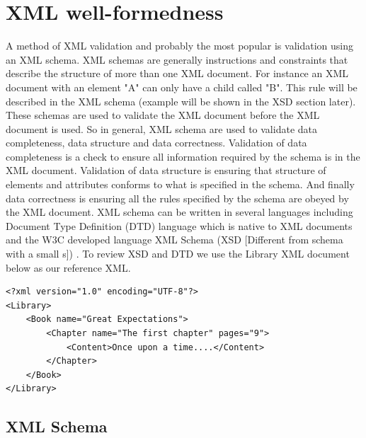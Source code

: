 \documentclass{report}
\begin{document}
\section{XML well-formedness}
A method of XML validation and probably the most popular is validation using an XML schema. XML schemas are generally instructions and constraints that describe the structure of more than one XML document. For instance an XML document with an element "A" can only have a child called "B". This rule will be described in the XML schema (example will be shown in the XSD section later). These schemas are used to validate the XML document before the XML document is used. So in general, XML schema are used to validate data completeness, data structure and data correctness. Validation of data completeness is a check to ensure all information required by the schema is in the XML document. Validation of data structure is ensuring that structure of elements and attributes conforms to what is specified in the schema. And finally data correctness is ensuring all the rules specified by the schema are obeyed by the XML document. XML schema can be written in several languages including Document Type Definition (DTD) language which is native to XML documents and the W3C developed language XML Schema (XSD [Different from schema with a small s]) \cite{xmlschema}. To review XSD and DTD we use the Library XML document below as our reference XML.

\lstset{language=XML,
		numbers=left,
    breaklines=true,
    tabsize=2,
    basicstyle=\ttfamily}


\begin{lstlisting}[caption=Library XML Document,frame=tlrb, label={lst:libraryxml}]
<?xml version="1.0" encoding="UTF-8"?>
<Library>
	<Book name="Great Expectations">
		<Chapter name="The first chapter" pages="9">
			<Content>Once upon a time....</Content>
		</Chapter>
	</Book>
</Library>
\end{lstlisting}

\subsection{XML Schema}
\end{document}
